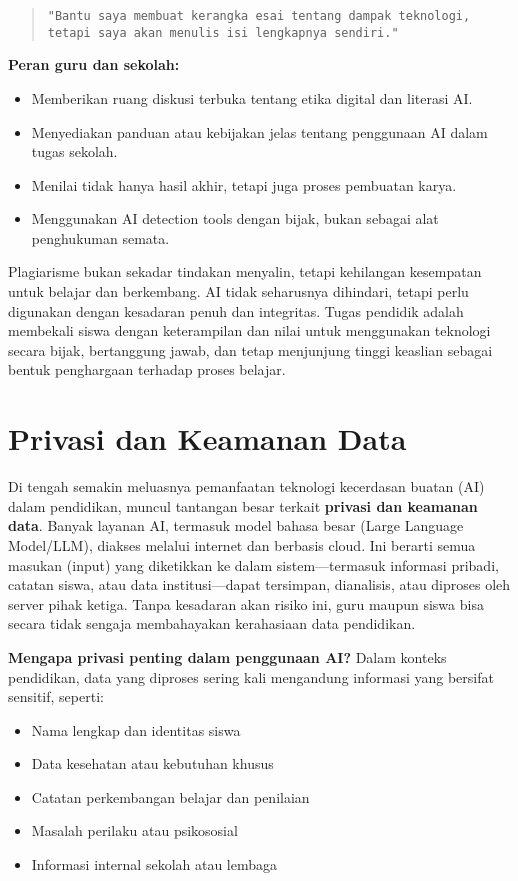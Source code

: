 \begin{quote}
	\centering
	\texttt{"Bantu saya membuat kerangka esai tentang dampak teknologi, tetapi saya akan menulis isi lengkapnya sendiri."}
\end{quote}

\textbf{Peran guru dan sekolah:}
\begin{itemize}
	\item Memberikan ruang diskusi terbuka tentang etika digital dan literasi AI.
	\item Menyediakan panduan atau kebijakan jelas tentang penggunaan AI dalam tugas sekolah.
	\item Menilai tidak hanya hasil akhir, tetapi juga proses pembuatan karya.
	\item Menggunakan AI detection tools dengan bijak, bukan sebagai alat penghukuman semata.
\end{itemize}
  
Plagiarisme bukan sekadar tindakan menyalin, tetapi kehilangan kesempatan untuk belajar dan berkembang. AI tidak seharusnya dihindari, tetapi perlu digunakan dengan kesadaran penuh dan integritas. Tugas pendidik adalah membekali siswa dengan keterampilan dan nilai untuk menggunakan teknologi secara bijak, bertanggung jawab, dan tetap menjunjung tinggi keaslian sebagai bentuk penghargaan terhadap proses belajar.


\section{Privasi dan Keamanan Data}

Di tengah semakin meluasnya pemanfaatan teknologi kecerdasan buatan (AI) dalam pendidikan, muncul tantangan besar terkait \textbf{privasi dan keamanan data}. Banyak layanan AI, termasuk model bahasa besar (Large Language Model/LLM), diakses melalui internet dan berbasis cloud. Ini berarti semua masukan (input) yang diketikkan ke dalam sistem—termasuk informasi pribadi, catatan siswa, atau data institusi—dapat tersimpan, dianalisis, atau diproses oleh server pihak ketiga. Tanpa kesadaran akan risiko ini, guru maupun siswa bisa secara tidak sengaja membahayakan kerahasiaan data pendidikan.

\textbf{Mengapa privasi penting dalam penggunaan AI?}  
Dalam konteks pendidikan, data yang diproses sering kali mengandung informasi yang bersifat sensitif, seperti:
\begin{itemize}
	\item Nama lengkap dan identitas siswa
	\item Data kesehatan atau kebutuhan khusus
	\item Catatan perkembangan belajar dan penilaian
	\item Masalah perilaku atau psikososial
	\item Informasi internal sekolah atau lembaga
\end{itemize}

